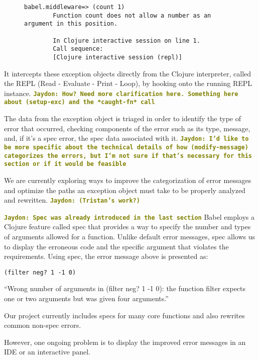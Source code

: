 \documentclass[12pt]{article}
\newcommand{\comment}[1]{{\bf \tt  {#1}}}
\newcommand{\jscomment}[1]{\textcolor{olive}{\comment{Jaydon: {#1}}}}
\begin{document}
\begin{figure}[h]
	\centering
	\begin{lstlisting}[breaklines=true, basicstyle=\ttfamily]
        babel.middleware=> (count 1)
        Function count does not allow a number as an argument in this position.

        In Clojure interactive session on line 1.
        Call sequence:
        [Clojure interactive session (repl)]
	\end{lstlisting}
\end{figure}

It intercepts these exception objects directly from the Clojure interpreter, called the REPL (Read - Evaluate - Print - Loop), by hooking onto the running REPL instance.
\jscomment{How? Need more clarification here. Something here about (setup-exc) and the *caught-fn* call}

The data from the exception object is triaged in order to identify the type of error that occurred, checking components of the error such as its type, message, and, if it's a spec error, the spec data associated with it.
\jscomment{I'd like to be more specific about the technical details of how (modify-message) categorizes the errors, but I'm not sure if that's necessary for this section or if it would be feasible}

We are currently exploring ways to improve the categorization of error messages and optimize the paths an exception object must take to be properly analyzed and rewritten. \jscomment{(Tristan's work?)}

\jscomment{Spec was already introduced in the last section}
Babel employs a Clojure feature called spec that provides a way to specify the number and types of arguments allowed for a function. 
Unlike default error messages, spec allows us to display the erroneous code and the specific argument that violates the requirements. 
Using spec, the error message above is presented as: 
\begin{verbatim}
(filter neg? 1 -1 0)
\end{verbatim}
``Wrong number of arguments in (filter neg? 1 -1 0): the function filter expects one or two arguments but was given four arguments.''

Our project currently includes specs for many core functions and also rewrites common non-spec errors. 

However, one ongoing problem is to display the improved error messages in an IDE or an interactive panel. 
\end{document}
